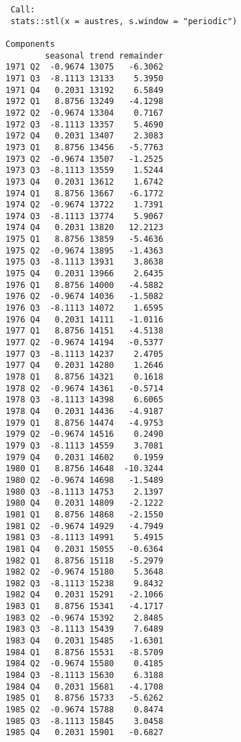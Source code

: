 \begin{knitrout}
\color{fgcolor}\begin{kframe}
\begin{alltt}
\hlstd{> } \hlkwb{=} \hlopt{::} \hlstd{=}\hlstd{)}
\hlstd{> }
\end{alltt}
\begin{verbatim}
 Call:
 stats::stl(x = austres, s.window = "periodic")

Components
        seasonal trend remainder
1971 Q2  -0.9674 13075   -6.3062
1971 Q3  -8.1113 13133    5.3950
1971 Q4   0.2031 13192    6.5849
1972 Q1   8.8756 13249   -4.1298
1972 Q2  -0.9674 13304    0.7167
1972 Q3  -8.1113 13357    5.4690
1972 Q4   0.2031 13407    2.3083
1973 Q1   8.8756 13456   -5.7763
1973 Q2  -0.9674 13507   -1.2525
1973 Q3  -8.1113 13559    1.5244
1973 Q4   0.2031 13612    1.6742
1974 Q1   8.8756 13667   -6.1772
1974 Q2  -0.9674 13722    1.7391
1974 Q3  -8.1113 13774    5.9067
1974 Q4   0.2031 13820   12.2123
1975 Q1   8.8756 13859   -5.4636
1975 Q2  -0.9674 13895   -1.4363
1975 Q3  -8.1113 13931    3.8638
1975 Q4   0.2031 13966    2.6435
1976 Q1   8.8756 14000   -4.5882
1976 Q2  -0.9674 14036   -1.5082
1976 Q3  -8.1113 14072    1.6595
1976 Q4   0.2031 14111   -1.0116
1977 Q1   8.8756 14151   -4.5138
1977 Q2  -0.9674 14194   -0.5377
1977 Q3  -8.1113 14237    2.4705
1977 Q4   0.2031 14280    1.2646
1978 Q1   8.8756 14321    0.1618
1978 Q2  -0.9674 14361   -0.5714
1978 Q3  -8.1113 14398    6.6065
1978 Q4   0.2031 14436   -4.9187
1979 Q1   8.8756 14474   -4.9753
1979 Q2  -0.9674 14516    0.2490
1979 Q3  -8.1113 14559    3.7081
1979 Q4   0.2031 14602    0.1959
1980 Q1   8.8756 14648  -10.3244
1980 Q2  -0.9674 14698   -1.5489
1980 Q3  -8.1113 14753    2.1397
1980 Q4   0.2031 14809   -2.1222
1981 Q1   8.8756 14868   -2.1550
1981 Q2  -0.9674 14929   -4.7949
1981 Q3  -8.1113 14991    5.4915
1981 Q4   0.2031 15055   -0.6364
1982 Q1   8.8756 15118   -5.2979
1982 Q2  -0.9674 15180    5.3648
1982 Q3  -8.1113 15238    9.8432
1982 Q4   0.2031 15291   -2.1066
1983 Q1   8.8756 15341   -4.1717
1983 Q2  -0.9674 15392    2.8485
1983 Q3  -8.1113 15439    7.6489
1983 Q4   0.2031 15485   -1.6301
1984 Q1   8.8756 15531   -8.5709
1984 Q2  -0.9674 15580    0.4185
1984 Q3  -8.1113 15630    6.3188
1984 Q4   0.2031 15681   -4.1708
1985 Q1   8.8756 15733   -5.6262
1985 Q2  -0.9674 15788    0.8474
1985 Q3  -8.1113 15845    3.0458
1985 Q4   0.2031 15901   -0.6827

\end{verbatim}
\end{kframe}
\end{knitrout}

